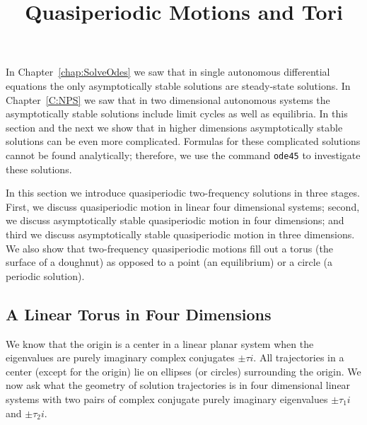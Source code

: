 \documentclass{ximera}
\title{Quasiperiodic Motions and Tori}
\begin{document}
\begin{abstract}
\end{abstract}
\maketitle


\label{S:NLD}


In Chapter~\ref{chap:SolveOdes} we saw that in single autonomous differential 
equations the only asymptotically stable solutions are steady-state 
solutions.  In Chapter~\ref{C:NPS} we saw that in two dimensional autonomous
systems the asymptotically stable solutions include limit cycles
 as well as equilibria.  In this section and the next we 
show that in higher dimensions asymptotically stable solutions can be even 
more complicated.   Formulas for these complicated solutions cannot be found
analytically; therefore, we use the \Matlab command {\tt ode45}
 to investigate these solutions.  

In this section we introduce quasiperiodic two-frequency solutions in three 
stages.  First, we discuss quasiperiodic motion 
in linear four dimensional systems; second, we discuss asymptotically stable 
quasiperiodic motion in four dimensions; and third we discuss asymptotically
stable quasiperiodic motion in three dimensions.  We also show that
two-frequency quasiperiodic motions fill out a torus (the surface of a
doughnut) as opposed to a point (an equilibrium) or a circle (a periodic 
solution).

\subsection*{A Linear Torus in Four Dimensions}

We know that the origin is a center in a linear planar system 
when the eigenvalues are purely imaginary complex conjugates $\pm\tau i$.
All trajectories in a center (except for the origin) lie on ellipses
(or circles) surrounding the origin. We now ask what the geometry 
of solution trajectories is in four dimensional linear systems with 
two pairs of complex conjugate purely imaginary eigenvalues $\pm\tau_1i$
and $\pm\tau_2i$. 
\end{document}
